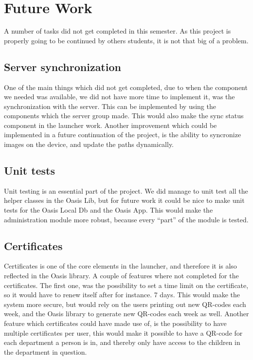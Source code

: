 \section{Future Work}

A number of tasks did not get completed in this semester. As this project is properly going to be continued by others students, it is not that big of a problem. 

\subsection{Server synchronization}
One of the main things which did not get completed, due to when the component we needed was available, we did not have more time to implement it, was the synchronization with the server. This can be implemented by using the components which the server group made. This would also make the sync status component in the launcher work.
Another improvement which could be implemented in a future continuation of the project, is the ability to syncronize images on the device, and update the paths dynamically.

\subsection{Unit tests}
Unit testing is an essential part of the project. We did manage to unit test all the helper classes in the Oasis Lib, but for future work it could be nice to make unit tests for the Oasis Local Db and the Oasis App. This would make the administration module more robust, because every "`part"' of the module is tested.

\subsection{Certificates}
Certificates is one of the core elements in the launcher, and therefore it is also reflected in the Oasis library. A couple of features where not completed for the certificates. The first one, was the possibility to set a time limit on the certificate, so it would have to renew itself after for instance. 7 days. This would make the system more secure, but would rely on the users printing out new QR-codes each week, and the Oasis library to generate new QR-codes each week as well.
Another feature which certificates could have made use of, is the possibility to have multiple certificates per user, this would make it possible to have a QR-code for each department a person is in, and thereby only have access to the children in the department in question.

